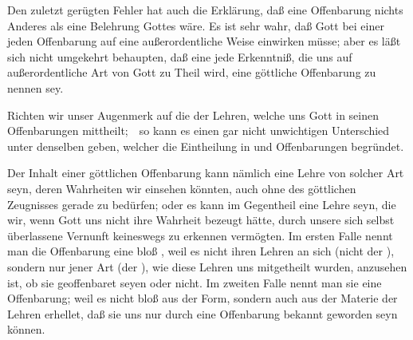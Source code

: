\begin{aufza}
\begin{aufzb}
\begin{aufzc}
\end{aufzc}
\item Den zuletzt gerügten Fehler hat auch die Erklärung, daß eine Offenbarung nichts Anderes als eine  Belehrung Gottes wäre. Es ist sehr wahr, daß Gott bei einer jeden Offenbarung auf eine außerordentliche Weise einwirken müsse; aber es läßt sich nicht umgekehrt behaupten, daß eine jede Erkenntniß, die uns auf außerordentliche Art von Gott zu Theil wird, eine göttliche Offenbarung zu nennen sey.
\end{aufzb}
\end{aufza}

Richten wir unser Augenmerk auf die  der Lehren, welche uns Gott in seinen Offenbarungen mittheilt;~\ so kann es einen gar nicht unwichtigen Unterschied unter denselben geben, welcher die Eintheilung in  und  Offenbarungen begründet.\par
Der Inhalt einer göttlichen Offenbarung kann nämlich eine Lehre von solcher Art seyn, deren Wahrheiten wir einsehen könnten, auch ohne des göttlichen Zeugnisses gerade zu bedürfen; oder es kann im Gegentheil eine Lehre seyn, die wir, wenn Gott uns nicht ihre Wahrheit bezeugt hätte, durch unsere sich selbst überlassene Vernunft keineswegs zu erkennen vermögten. Im ersten Falle nennt man die Offenbarung eine bloß , weil es nicht ihren Lehren an sich (nicht der ), sondern nur jener Art (der ), wie diese Lehren uns mitgetheilt wurden, anzusehen ist, ob sie geoffenbaret seyen oder nicht. Im zweiten Falle nennt man sie eine  Offenbarung; weil es nicht bloß aus der Form, sondern auch aus der Materie der Lehren erhellet, daß sie uns nur durch eine Offenbarung bekannt geworden seyn können.

